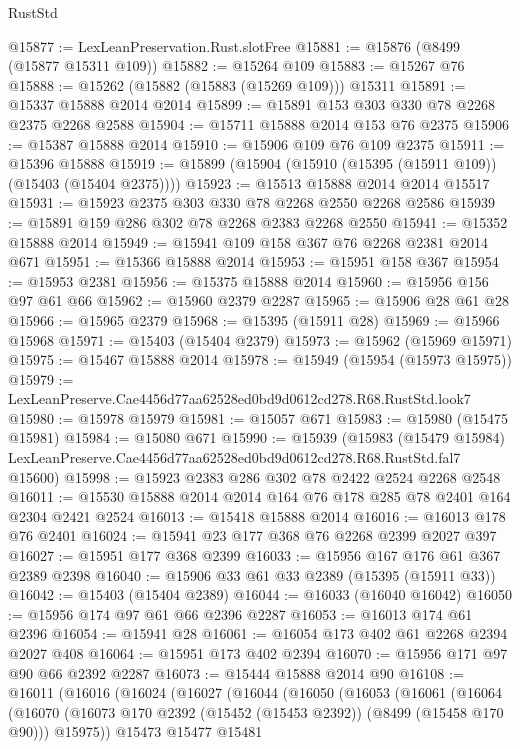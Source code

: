 \begin{lexlean}{RustStd}
\begin{coremodule}
@15877 := LexLeanPreservation.Rust.slotFree
@15881 := @15876 (@8499 (@15877 @15311 @109))
@15882 := @15264 @109
@15883 := @15267 @76
@15888 := @15262 (@15882 (@15883 (@15269 @109))) @15311
@15891 := @15337 @15888 @2014 @2014
@15899 := @15891 @153 @303 @330 @78 @2268 @2375 @2268 @2588
@15904 := @15711 @15888 @2014 @153 @76 @2375
@15906 := @15387 @15888 @2014
@15910 := @15906 @109 @76 @109 @2375
@15911 := @15396 @15888
@15919 := @15899 (@15904 (@15910 (@15395 (@15911 @109)) (@15403 (@15404 @2375))))
@15923 := @15513 @15888 @2014 @2014 @15517
@15931 := @15923 @2375 @303 @330 @78 @2268 @2550 @2268 @2586
@15939 := @15891 @159 @286 @302 @78 @2268 @2383 @2268 @2550
@15941 := @15352 @15888 @2014
@15949 := @15941 @109 @158 @367 @76 @2268 @2381 @2014 @671
@15951 := @15366 @15888 @2014
@15953 := @15951 @158 @367
@15954 := @15953 @2381
@15956 := @15375 @15888 @2014
@15960 := @15956 @156 @97 @61 @66
@15962 := @15960 @2379 @2287
@15965 := @15906 @28 @61 @28
@15966 := @15965 @2379
@15968 := @15395 (@15911 @28)
@15969 := @15966 @15968
@15971 := @15403 (@15404 @2379)
@15973 := @15962 (@15969 @15971)
@15975 := @15467 @15888 @2014
@15978 := @15949 (@15954 (@15973 @15975))
@15979 := LexLeanPreserve.Cae4456d77aa62528ed0bd9d0612cd278.R68.RustStd.look7
@15980 := @15978 @15979
@15981 := @15057 @671
@15983 := @15980 (@15475 @15981)
@15984 := @15080 @671
@15990 := @15939
    (@15983
      (@15479 @15984)
      LexLeanPreserve.Cae4456d77aa62528ed0bd9d0612cd278.R68.RustStd.fal7
      @15600)
@15998 := @15923 @2383 @286 @302 @78 @2422 @2524 @2268 @2548
@16011 := @15530 @15888 @2014 @2014 @164 @76 @178 @285 @78 @2401 @164 @2304 @2421 @2524
@16013 := @15418 @15888 @2014
@16016 := @16013 @178 @76 @2401
@16024 := @15941 @23 @177 @368 @76 @2268 @2399 @2027 @397
@16027 := @15951 @177 @368 @2399
@16033 := @15956 @167 @176 @61 @367 @2389 @2398
@16040 := @15906 @33 @61 @33 @2389 (@15395 (@15911 @33))
@16042 := @15403 (@15404 @2389)
@16044 := @16033 (@16040 @16042)
@16050 := @15956 @174 @97 @61 @66 @2396 @2287
@16053 := @16013 @174 @61 @2396
@16054 := @15941 @28
@16061 := @16054 @173 @402 @61 @2268 @2394 @2027 @408
@16064 := @15951 @173 @402 @2394
@16070 := @15956 @171 @97 @90 @66 @2392 @2287
@16073 := @15444 @15888 @2014 @90
@16108 := @16011
    (@16016
      (@16024
        (@16027
          (@16044
            (@16050
              (@16053
                (@16061
                  (@16064
                    (@16070
                      (@16073 @170 @2392 (@15452 (@15453 @2392)) (@8499 (@15458 @170 @90)))
                      @15975))
                  @15473
                  @15477
                  @15481

\end{coremodule}
\end{lexlean}
